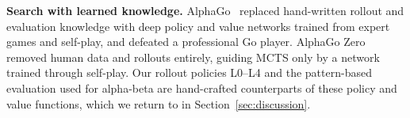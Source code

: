 \textbf{Search with learned knowledge.} AlphaGo~\cite{silver2016mastering} replaced hand-written rollout and evaluation knowledge with deep policy and value networks trained from expert games and self-play, and defeated a professional Go player. AlphaGo Zero~\cite{silver2017mastering} removed human data and rollouts entirely, guiding MCTS only by a network trained through self-play. Our rollout policies L0--L4 and the pattern-based evaluation used for alpha-beta are hand-crafted counterparts of these policy and value functions, which we return to in Section~\ref{sec:discussion}.
